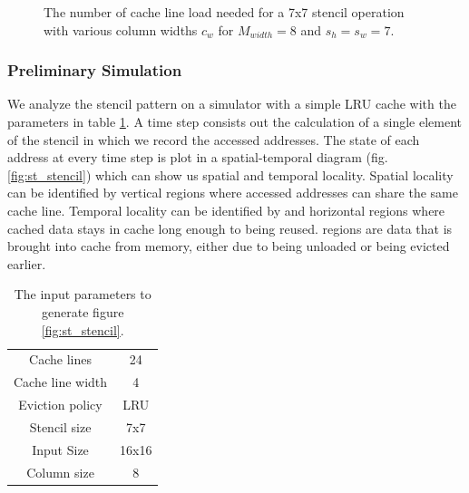 \documentclass{article}
\begin{document}
\begin{figure}
{
}
\caption{
    The number of cache line load needed for a 7x7 stencil operation with various column widths $c_w$ for $M_{width} = 8$ and $s_h = s_w = 7$.
}
\label{fig:matrix_loads}
\end{figure}

\subsubsection{Preliminary Simulation}
\label{sec:stencil_sim}
We analyze the stencil pattern on a simulator with a simple LRU cache with the parameters in table \ref{tab:sim_stencil_params}. 
A time step consists out the calculation of a single element of the stencil in which we record the accessed addresses.
The state of each address at every time step is plot in a spatial-temporal diagram (fig. \ref{fig:st_stencil}) which can show us spatial and temporal locality.
Spatial locality can be identified by  vertical regions where accessed addresses can share the same cache line.
Temporal locality can be identified by  and  horizontal regions where cached data stays in cache long enough to being reused.  regions are data that is brought into cache from memory, either due to being unloaded or being evicted earlier.

\begin{table}[H]
    \centering
    \begin{tabular}{|c c|}
        \hline
        Cache lines      & 24   \\
        Cache line width & 4    \\
        Eviction policy  & LRU  \\
        \hline
        Stencil size     & 7x7  \\
        Input Size       & 16x16\\
        Column size      & 8    \\
        \hline
    \end{tabular}
    \caption{
        The input parameters to generate figure \ref{fig:st_stencil}.
    }
    \label{tab:sim_stencil_params}
\end{table}
\end{document}
